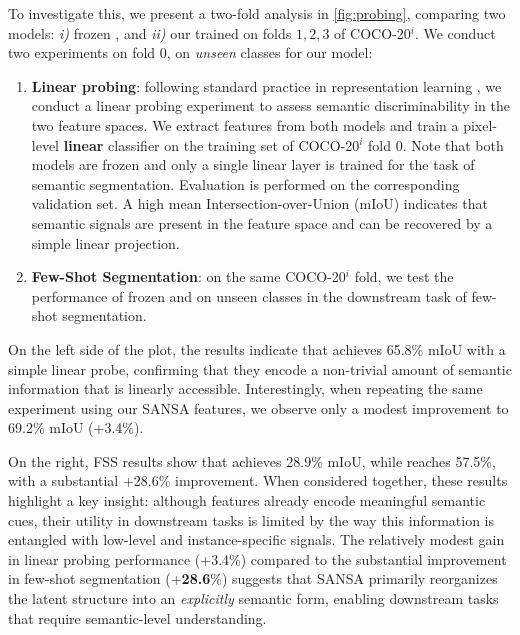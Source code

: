 To investigate this, we present a two-fold analysis in \cref{fig:probing}, comparing two models: \textit{i)} frozen \sam{}, and \textit{ii)} our \ours{} trained on folds $1, 2, 3$ of COCO-20$^i$. We conduct two experiments on fold $0$, \ie on \textit{unseen} classes for our model:
\begin{enumerate}[noitemsep,topsep=2pt,leftmargin=*]
\item \textbf{Linear probing}: following standard practice in representation learning \cite{he2020momentum, oquab2023dinov2, caron2021emerging}, we conduct a linear probing experiment to assess semantic discriminability in the two feature spaces.  We extract features from both models and train a pixel-level \textbf{linear} classifier on the training set of COCO-20$^i$ fold 0. Note that both models are frozen and only a single linear layer is trained for the task of semantic segmentation. Evaluation is performed on the corresponding validation set. A high mean Intersection-over-Union (mIoU) indicates that semantic signals are present in the feature space and can be recovered by a simple linear projection.
\item \textbf{Few-Shot Segmentation}: on the same COCO-20$^i$ fold, we test the performance of frozen \sam{} and \ours{} on unseen classes in the downstream task of few-shot segmentation.
\end{enumerate}



On the left side of the plot, the results indicate that \sam{} achieves 65.8\% mIoU with a simple linear probe,  confirming that they encode a non-trivial amount of semantic information that is linearly accessible. Interestingly, when repeating the same experiment using our SANSA features, we observe only a modest improvement to 69.2\% mIoU (+3.4\%). 



On the right, FSS results show that \sam{} achieves 28.9\% mIoU, while \ours{} reaches 57.5\%, with a substantial +28.6\% improvement.
When considered together, these results highlight a key insight: although \sam{} features already encode meaningful semantic cues, their utility in downstream tasks is limited by the way this information is entangled with low-level and instance-specific signals. 
The relatively modest gain in linear probing performance (+3.4\%) compared to the substantial improvement in few-shot segmentation (+\textbf{28.6}\%) suggests that SANSA primarily reorganizes the latent structure into an \textit{explicitly} semantic form, enabling downstream tasks that require semantic-level understanding.

